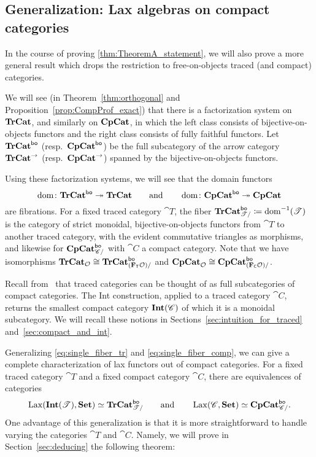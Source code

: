 \documentclass[11pt,oneside,article]{memoir}
\begin{document}
\subsection{Generalization: Lax algebras on compact categories}

In the course of proving \ref{thm:TheoremA_statement}, we will also prove a more general result
which drops the restriction to free-on-objects traced (and compact) categories.

We will see (in Theorem~\ref{thm:orthogonal} and Proposition~\ref{prop:CompProf_exact}) that there is a factorization
system on $\mathbf{TrCat}$, and similarly on $\mathbf{CpCat}$, in which the left class consists of
bijective-on-objects functors and the right class consists of fully faithful functors. Let
$\mathbf{TrCat}^{\mathsf{bo}}$ (resp.~$\mathbf{CpCat}^{\mathsf{bo}}$) be the full subcategory of the arrow category $\mathbf{TrCat}^{\to}$
(resp.~$\mathbf{CpCat}^{\to}$) spanned by the bijective-on-objects functors.

Using these factorization systems, we will see that the domain functors
$$\operatorname{dom}\colon\mathbf{TrCat}^{\mathsf{bo}}\twoheadrightarrow\mathbf{TrCat}\qquad\text{and}\qquad\operatorname{dom}\colon\mathbf{CpCat}^{\mathsf{bo}}\twoheadrightarrow\mathbf{CpCat}$$
are fibrations. For a fixed traced category $\cat{T}$, the fiber
$\mathbf{TrCat}^{\mathsf{bo}}_{\mathscr{T}/}\coloneqq\operatorname{dom}^{-1}(\mathscr{T})$ is the category of strict monoidal,
bijective-on-objects functors from $\cat{T}$ to another traced category, with the evident
commutative triangles as morphisms, and likewise for $\mathbf{CpCat}^{\mathsf{bo}}_{\mathscr{C}/}$ with $\cat{C}$ a
compact category. Note that we have isomorphisms $\mathbf{TrCat}_{\mathcal{O}}\cong\mathbf{TrCat}^{\mathsf{bo}}_{(\mathbf{F}_{\mathsf{T}}\mathcal{O})/}$ and $\mathbf{CpCat}_{\mathcal{O}}\cong\mathbf{CpCat}^{\mathsf{bo}}_{(\mathbf{F}_{\mathsf{C}}\mathcal{O})/}$.

Recall from~\cite{JoyalStreetVerity} that traced categories can be thought of as full subcategories
of compact categories.  The Int construction, applied to a traced category $\cat{C}$, returns the
smallest compact category $\mathbf{Int}(\mathscr{C})$ of which it is a monoidal subcategory. We will recall these
notions in Sections~\ref{sec:intuition_for_traced} and~\ref{sec:compact_and_int}.

Generalizing \eqref{eq:single_fiber_tr} and \eqref{eq:single_fiber_comp}, we can give a complete
characterization of lax functors out of compact categories. For a fixed traced category $\cat{T}$
and a fixed compact category $\cat{C}$, there are equivalences of categories
\begin{equation}\label{eqn:lax_compcat_bo}
   \operatorname{Lax}(\mathbf{Int}(\mathscr{T}),\mathbf{Set})\simeq\mathbf{TrCat}^{\mathsf{bo}}_{\mathscr{T}/}
   \qquad\text{and}\qquad
   \operatorname{Lax}(\mathscr{C},\mathbf{Set})\simeq\mathbf{CpCat}^{\mathsf{bo}}_{\mathscr{C}/}.
\end{equation}
One advantage of this generalization is that it is more straightforward to handle varying the
categories $\cat{T}$ and $\cat{C}$. Namely, we will prove in Section~\ref{sec:deducing} the
following theorem:
\end{document}
